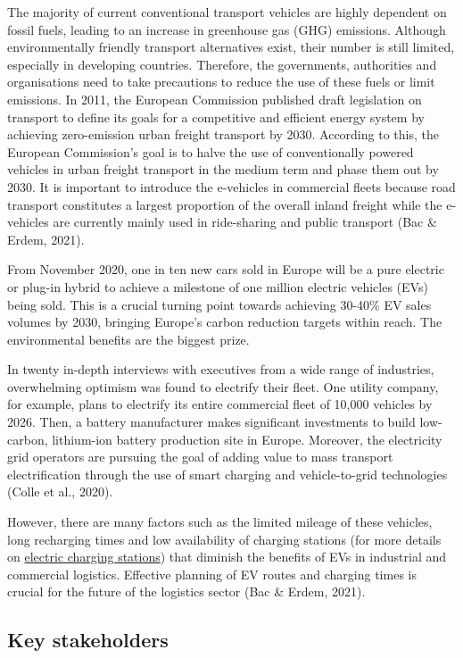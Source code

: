 \documentclass[
]{book}
\begin{document}
The majority of current conventional transport vehicles are highly dependent on fossil fuels, leading to an increase in greenhouse gas (GHG) emissions. Although environmentally friendly transport alternatives exist, their number is still limited, especially in developing countries. Therefore, the governments, authorities and organisations need to take precautions to reduce the use of these fuels or limit emissions. In 2011, the European Commission published draft legislation on transport to define its goals for a competitive and efficient energy system by achieving zero-emission urban freight transport by 2030. According to this, the European Commission's goal is to halve the use of conventionally powered vehicles in urban freight transport in the medium term and phase them out by 2030. It is important to introduce the e-vehicles in commercial fleets because road transport constitutes a largest proportion of the overall inland freight while the e-vehicles are currently mainly used in ride-sharing and public transport (Bac \& Erdem, 2021).

From November 2020, one in ten new cars sold in Europe will be a pure electric or plug-in hybrid to achieve a milestone of one million electric vehicles (EVs) being sold. This is a crucial turning point towards achieving 30-40\% EV sales volumes by 2030, bringing Europe's carbon reduction targets within reach. The environmental benefits are the biggest prize.

In twenty in-depth interviews with executives from a wide range of industries, overwhelming optimism was found to electrify their fleet. One utility company, for example, plans to electrify its entire commercial fleet of 10,000 vehicles by 2026. Then, a battery manufacturer makes significant investments to build low-carbon, lithium-ion battery production site in Europe. Moreover, the electricity grid operators are pursuing the goal of adding value to mass transport electrification through the use of smart charging and vehicle-to-grid technologies (Colle et al., 2020).

However, there are many factors such as the limited mileage of these vehicles, long recharging times and low availability of charging stations (for more details on \protect\hyperlink{charging_station}{electric charging stations}) that diminish the benefits of EVs in industrial and commercial logistics. Effective planning of EV routes and charging times is crucial for the future of the logistics sector (Bac \& Erdem, 2021).

\hypertarget{key-stakeholders-34}{%
\subsection*{Key stakeholders}\label{key-stakeholders-34}}
\end{document}
